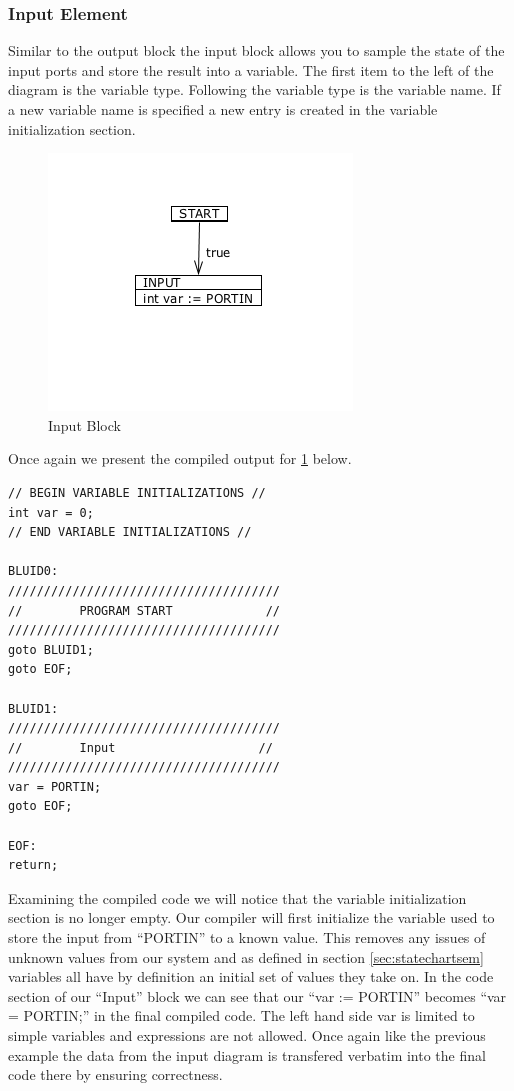 \subsubsection{Input Element}

Similar to the output block the input block allows you to sample the state of the input ports and store the result into a variable. The first item to the left of the diagram is the variable type. Following the variable type is the variable name. If a new variable name is specified a new entry is created in the variable initialization section. 


\begin{figure}[htb]
	\centering
	\includegraphics[width=\imgmedphoto]{./images/correctness_ex_input.png}
	\caption{Input Block}
	\label{fig:correctness_ex_input}
\end{figure}

Once again we present the compiled output for \ref{fig:correctness_ex_input} below.

\begin{minipage}{\textwidth}
\begin{lstlisting}[frame=single]
// BEGIN VARIABLE INITIALIZATIONS //
int var = 0;
// END VARIABLE INITIALIZATIONS //

BLUID0:
//////////////////////////////////////
//        PROGRAM START             //
//////////////////////////////////////
goto BLUID1;
goto EOF;

BLUID1:
//////////////////////////////////////
//        Input                    //
//////////////////////////////////////
var = PORTIN;
goto EOF;

EOF:
return;
\end{lstlisting}
\end{minipage}

Examining the compiled code we will notice that the variable initialization section is no longer empty. Our compiler will first initialize the variable used to store the input from ``PORTIN'' to a known value. This removes any issues of unknown values from our system and as defined in section \ref{sec:statechartsem} variables all have by definition an initial set of values they take on. In the code section of our ``Input'' block we can see that our ``var := PORTIN'' becomes ``var = PORTIN;'' in the final compiled code. The left hand side var is limited to simple variables and expressions are not allowed. Once again like the previous example the data from the input diagram is transfered verbatim into the final code there by ensuring correctness.

